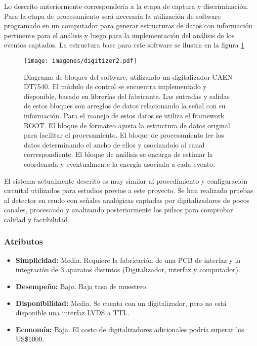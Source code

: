 \par Lo descrito anteriormente correspondería a la etapa de captura y discriminación. Para la etapa de procesamiento será necesaria la utilización de software programado en un computador para generar estructuras de datos con información pertinente para el análisis y luego para la implementación del análisis de los eventos captados. La estructura base para este software se ilustra en la figura \ref{fig:digitizer2}

\begin{figure}[H]
	\centering
	\texttt{[image: imagenes/digitizer2.pdf]}
	\caption{Diagrama de bloques del software, utilizando un digitalizador CAEN DT7540. El módulo de control se encuentra implementado y disponible, basado en librerías del fabricante. Las entradas y salidas de estos bloques son arreglos de datos relacionando la señal con su información. Para el manejo de estos datos se utiliza el framework ROOT\cite{CERN2020ROOT:Framework}. El bloque de formateo ajusta la estructura de datos original para facilitar el procesamiento. El bloque de procesamiento lee los datos determinando el ancho de ellos y asociandolo al canal correspondiente. El bloque de análisis se encarga de estimar la coordenada y eventualmente la energía asociada a cada evento.}
	\label{fig:digitizer2}
\end{figure}


\par El sistema actualmente descrito es muy similar al procedimiento y configuración circuital utilizados para estudios previos a este proyecto. Se han realizado pruebas al detector en crudo con señales analógicas captadas por digitalizadores de pocos canales, procesando y analizando posteriormente los pulsos para comprobar calidad y factibilidad.

\subsubsection*{Atributos}
\begin{itemize}
	\item \textbf{Simplicidad:} Media. Requiere la fabricación de una PCB de interfaz y la integración de 3 aparatos distintos (Digitalizador, interfaz y computador).
	\item \textbf{Desempeño:} Bajo. Baja tasa de muestreo.
	\item \textbf{Disponibilidad:} Media. Se cuenta con un digitalizador, pero no está disponible una interfaz LVDS a TTL.
	\item \textbf{Economía:} Baja. El costo de digitalizadores adicionales podría superar los US\$1000.
\end{itemize}

